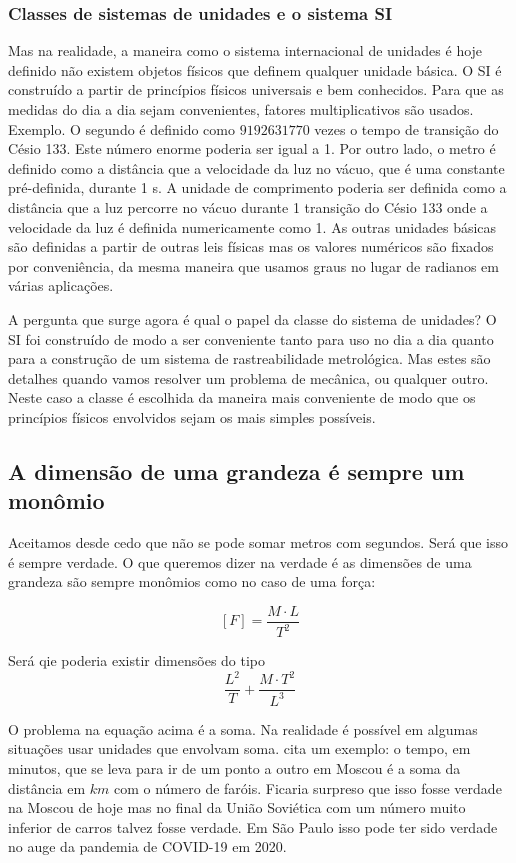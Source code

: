 \subsubsection{Classes de sistemas de unidades e o sistema SI}

Mas na realidade, a maneira como o sistema internacional de unidades é hoje definido não existem objetos físicos que definem qualquer unidade básica. O SI é construído a partir de princípios físicos universais e bem conhecidos. Para que as medidas do dia a dia sejam convenientes, fatores multiplicativos são usados. Exemplo. O segundo é definido como $9 192 631 770$ vezes o tempo de transição do Césio 133. Este número enorme poderia ser igual a 1. Por outro lado, o metro é definido como a distância que a velocidade da luz no vácuo, que é uma constante pré-definida, durante 1 s. A unidade de comprimento poderia ser definida como a distância que a luz percorre no vácuo durante 1 transição do Césio 133 onde a velocidade da luz é definida numericamente como 1. As outras unidades básicas são definidas a partir de outras leis físicas mas os valores numéricos são fixados por conveniência, da mesma maneira que usamos graus no lugar de radianos em várias aplicações.

A pergunta que surge agora é qual o papel da classe do sistema de unidades? O SI  foi construído de modo a ser conveniente tanto para uso no dia a dia quanto para a construção de um sistema de rastreabilidade metrológica. Mas estes são detalhes quando vamos resolver um problema de mecânica, ou qualquer outro. Neste caso a classe é escolhida da maneira mais conveniente de modo que os princípios físicos envolvidos sejam os mais simples possíveis. 






\subsection{A dimensão de uma grandeza é sempre um monômio}

Aceitamos desde cedo que não se pode somar metros com segundos. Será que isso é sempre verdade. O que queremos dizer na verdade é as dimensões de uma grandeza são sempre monômios como no caso de uma força:

\[
  [F] = \frac{M\cdot L}{T^2}
\]

Será qie poderia existir dimensões do tipo
\[
\frac{L^2}{T} + \frac{M\cdot T^2}{L^3}
\]

O problema na equação acima é a soma. Na realidade é possível em algumas situações usar unidades que envolvam soma. \cite{Barenblatt96} cita um exemplo: o tempo, em minutos, que se leva para ir de um ponto a outro em Moscou é a soma da distância em $km$ com o número de faróis. Ficaria surpreso que isso fosse verdade na Moscou de hoje mas no final da União Soviética com um número muito inferior de carros talvez fosse verdade. Em São Paulo isso pode ter sido verdade no auge da pandemia de COVID-19 em 2020.


